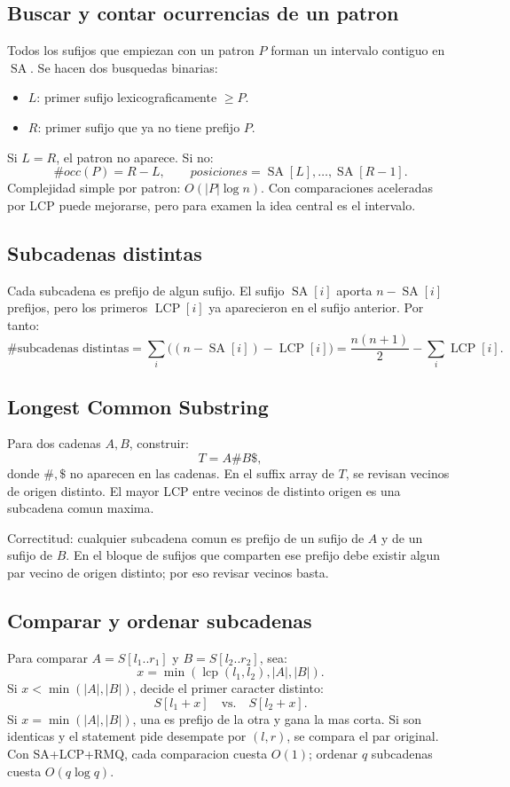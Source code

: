 \documentclass[10pt]{article}
\newcommand{\bigO}{O}
\newcommand{\SA}{\operatorname{SA}}
\newcommand{\LCP}{\operatorname{LCP}}
\begin{document}
\subsection{Buscar y contar ocurrencias de un patron}
Todos los sufijos que empiezan con un patron \(P\) forman un intervalo contiguo en \(\SA\). Se hacen dos busquedas
binarias:
\begin{itemize}
\item \(L\): primer sufijo lexicograficamente \(\ge P\).
\item \(R\): primer sufijo que ya no tiene prefijo \(P\).
\end{itemize}
Si \(L=R\), el patron no aparece. Si no:
\[
\#occ(P)=R-L,\qquad posiciones=\SA[L],\ldots,\SA[R-1].
\]
Complejidad simple por patron: \(\bigO(|P|\log n)\). Con comparaciones aceleradas por LCP puede mejorarse,
pero para examen la idea central es el intervalo.

\subsection{Subcadenas distintas}
Cada subcadena es prefijo de algun sufijo. El sufijo \(\SA[i]\) aporta \(n-\SA[i]\) prefijos, pero los primeros
\(\LCP[i]\) ya aparecieron en el sufijo anterior. Por tanto:
\[
\#\text{subcadenas distintas}
=\sum_i \big((n-\SA[i])-\LCP[i]\big)
=\frac{n(n+1)}2-\sum_i\LCP[i].
\]

\subsection{Longest Common Substring}
Para dos cadenas \(A,B\), construir:
\[
T=A\#B\$,
\]
donde \(\#,\$\) no aparecen en las cadenas. En el suffix array de \(T\), se revisan vecinos de origen distinto.
El mayor LCP entre vecinos de distinto origen es una subcadena comun maxima.

Correctitud: cualquier subcadena comun es prefijo de un sufijo de \(A\) y de un sufijo de \(B\). En el bloque de
sufijos que comparten ese prefijo debe existir algun par vecino de origen distinto; por eso revisar vecinos basta.

\subsection{Comparar y ordenar subcadenas}
Para comparar \(A=S[l_1..r_1]\) y \(B=S[l_2..r_2]\), sea:
\[
x=\min(\operatorname{lcp}(l_1,l_2), |A|, |B|).
\]
Si \(x<\min(|A|,|B|)\), decide el primer caracter distinto:
\[
S[l_1+x] \quad \text{vs.}\quad S[l_2+x].
\]
Si \(x=\min(|A|,|B|)\), una es prefijo de la otra y gana la mas corta. Si son identicas y el statement pide
desempate por \((l,r)\), se compara el par original. Con SA+LCP+RMQ, cada comparacion cuesta \(\bigO(1)\);
ordenar \(q\) subcadenas cuesta \(\bigO(q\log q)\).
\end{document}
